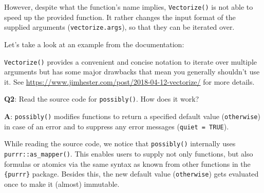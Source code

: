 \documentclass[
]{krantz}
\makeatletter
\newenvironment{Shaded}{\begin{snugshade}}{\end{snugshade}}
\newcommand{\CommentTok}[1]{\textcolor[rgb]{0.56,0.35,0.01}{\textit{#1}}}
\newcommand{\DecValTok}[1]{\textcolor[rgb]{0.00,0.00,0.81}{#1}}
\newcommand{\KeywordTok}[1]{\textcolor[rgb]{0.13,0.29,0.53}{\textbf{#1}}}
\newcommand{\NormalTok}[1]{#1}
\newcommand{\OperatorTok}[1]{\textcolor[rgb]{0.81,0.36,0.00}{\textbf{#1}}}
\newcommand{\StringTok}[1]{\textcolor[rgb]{0.31,0.60,0.02}{#1}}
\newenvironment{kframe}{%
\medskip{}
\setlength{\fboxsep}{.8em}
 \def\at@end@of@kframe{}%
 \ifinner\ifhmode%
  \def\at@end@of@kframe{\end{minipage}}%
  \begin{minipage}{\columnwidth}%
 \fi\fi%
 \def\FrameCommand##1{\hskip\@totalleftmargin \hskip-\fboxsep
 \colorbox{shadecolor}{##1}\hskip-\fboxsep
     \hskip-\linewidth \hskip-\@totalleftmargin \hskip\columnwidth}%
 \MakeFramed {\advance\hsize-\width
   \@totalleftmargin\z@ \linewidth\hsize
   \@setminipage}}%
 {\par\unskip\endMakeFramed%
 \at@end@of@kframe}
\renewenvironment{Shaded}{\begin{kframe}}{\end{kframe}}
\renewcommand{\KeywordTok} [1]{\textcolor[rgb]{0.00,0.44,0.13}{{#1}}}
\renewcommand{\DecValTok}  [1]{\textcolor[rgb]{0.25,0.63,0.44}{{#1}}}
\renewcommand{\StringTok}  [1]{\textcolor[rgb]{0.25,0.44,0.63}{{#1}}}
\renewcommand{\CommentTok} [1]{\textcolor[rgb]{0.38,0.63,0.69}{{#1}}}
\renewcommand{\NormalTok}  [1]{{#1}}
\makeatother
\begin{document}
However, despite what the function's name implies, \texttt{Vectorize()} is not able to speed up the provided function. It rather changes the input format of the supplied arguments (\texttt{vectorize.args}), so that they can be iterated over.

Let's take a look at an example from the documentation:

\begin{Shaded}
\end{Shaded}

\texttt{Vectorize()} provides a convenient and concise notation to iterate over multiple arguments but has some major drawbacks that mean you generally shouldn't use it. See \url{https://www.jimhester.com/post/2018-04-12-vectorize/} for more details.

\textbf{{Q2}}: Read the source code for \texttt{possibly()}. How does it work?

\textbf{{A}}: \texttt{possibly()} modifies functions to return a specified default value (\texttt{otherwise}) in case of an error and to suppress any error messages (\texttt{quiet\ =\ TRUE}).

While reading the source code, we notice that \texttt{possibly()} internally uses \texttt{purrr::as\_mapper()}. This enables users to supply not only functions, but also formulas or atomics via the same syntax as known from other functions in the \texttt{\{purrr\}} package. Besides this, the new default value (\texttt{otherwise}) gets evaluated once to make it (almost) immutable.
\end{document}
